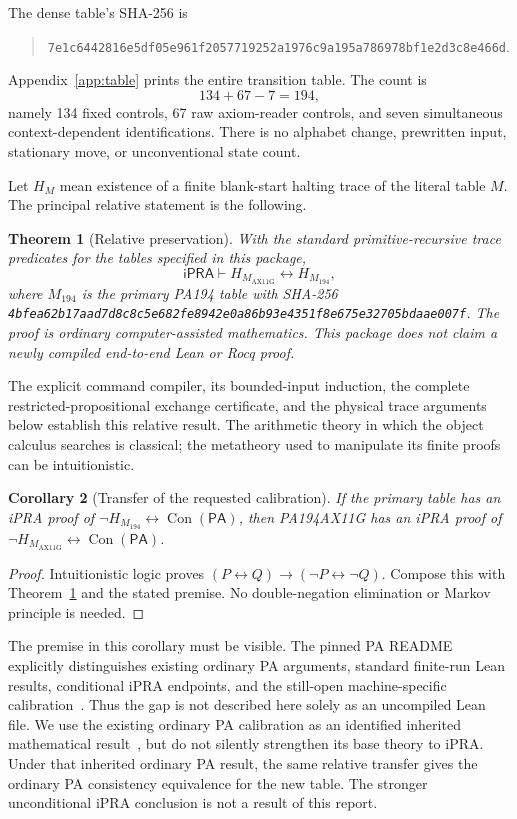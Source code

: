 \documentclass[11pt,letterpaper]{article}
\newcommand{\ipra}{\mathsf{iPRA}}
\newcommand{\pa}{\mathsf{PA}}
\newcommand{\Con}{\operatorname{Con}}
\newcommand{\Mnew}{M_{\mathrm{AX11G}}}
\newcommand{\Mold}{M_{194}}
\newtheorem{theorem}{Theorem}[section]
\newtheorem{corollary}[theorem]{Corollary}
\begin{document}
The dense table's SHA-256 is
\begin{quote}\small
\nolinkurl{7e1c6442816e5df05e961f2057719252a1976c9a195a786978bf1e2d3c8e466d}.
\end{quote}
Appendix~\ref{app:table} prints the entire transition table. The count is
\[
             \boxed{134+67-7=194,}
\]
namely 134 fixed controls, 67 raw axiom-reader controls, and seven
simultaneous context-dependent identifications. There is no alphabet
change, prewritten input, stationary move, or unconventional state count.

Let $H_M$ mean existence of a finite blank-start halting trace of the
literal table $M$. The principal relative statement is the following.

\begin{theorem}[Relative preservation]
\label{thm:relative}
With the standard primitive-recursive trace predicates for the tables
specified in this package,
\[
        \ipra\vdash H_{\Mnew}\leftrightarrow H_{\Mold},
\]
where $\Mold$ is the primary PA194 table with SHA-256
\nolinkurl{4bfea62b17aad7d8c8c5e682fe8942e0a86b93e4351f8e675e32705bdaae007f}.
The proof is ordinary computer-assisted mathematics. This package does
not claim a newly compiled end-to-end Lean or Rocq proof.
\end{theorem}

The explicit command compiler, its bounded-input induction, the complete
restricted-propositional exchange certificate, and the physical trace
arguments below establish this relative result. The arithmetic theory in
which the object calculus searches is classical; the metatheory used to
manipulate its finite proofs can be intuitionistic.

\begin{corollary}[Transfer of the requested calibration]
If the primary table has an iPRA proof of
$\neg H_{\Mold}\leftrightarrow\Con(\pa)$, then PA194AX11G has an iPRA
proof of $\neg H_{\Mnew}\leftrightarrow\Con(\pa)$.
\end{corollary}
\begin{proof}
Intuitionistic logic proves
$(P\leftrightarrow Q)\to(\neg P\leftrightarrow\neg Q)$.
Compose this with Theorem~\ref{thm:relative} and the stated premise.
No double-negation elimination or Markov principle is needed.
\end{proof}

The premise in this corollary must be visible. The pinned PA README
explicitly distinguishes existing ordinary PA arguments, standard finite-run
Lean results, conditional iPRA endpoints, and the still-open machine-specific
calibration~\cite{pa-status}. Thus the gap is not described here solely as
an uncompiled Lean file. We use the existing ordinary PA calibration as an
identified inherited mathematical result~\cite{primary}, but do not silently strengthen
its base theory to iPRA. Under that inherited ordinary PA result, the same
relative transfer gives the ordinary PA consistency equivalence for the
new table. The stronger unconditional iPRA conclusion is not a result of
this report.
\end{document}
